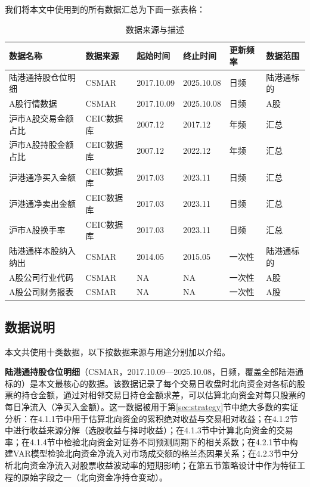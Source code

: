 \documentclass{article}
\begin{document}
我们将本文中使用到的所有数据汇总为下面一张表格：

\begin{table}[!ht]
    \label{tab:data_summary}
    \centering
    \small  %
    \begin{tabularx}{\textwidth}{|X|l|l|l|l|X|}
    \hline
    \textbf{数据名称} & \textbf{数据来源} & \textbf{起始时间} & \textbf{终止时间} & \textbf{更新频率} & \textbf{数据范围} \\ \hline
    陆港通持股仓位明细 & CSMAR & 2017.10.09 & 2025.10.08 & 日频 & 陆港通标的 \\ \hline
    A股行情数据 & CSMAR & 2017.10.09 & 2025.10.08 & 日频 & A股 \\ \hline
    沪市A股交易金额占比 & CEIC数据库 & 2007.12 & 2017.12 & 年频 & 汇总 \\ \hline
    沪市A股持股金额占比 & CEIC数据库 & 2007.12 & 2022.12 & 年频 & 汇总 \\ \hline
    沪港通净买入金额 & CEIC数据库 & 2017.03 & 2023.11 & 日频 & 汇总 \\ \hline
    沪港通净卖出金额 & CEIC数据库 & 2017.03 & 2023.11 & 日频 & 汇总 \\ \hline
    沪市A股换手率 & CEIC数据库 & 2017.03 & 2023.11 & 日频 & 汇总 \\ \hline
    陆港通样本股纳入纳出 & CSMAR & 2014.05 & 2015.05 & 一次性 & 陆港通标的 \\ \hline
    A股公司行业代码 & CSMAR & NA & NA & 一次性 & A股 \\ \hline
    A股公司财务报表 & CSMAR & NA & NA & 一次性 & A股 \\ \hline
    \end{tabularx}
    \caption{数据来源与描述}
\end{table}

\subsection*{数据说明}

本文共使用十类数据，以下按数据来源与用途分别加以介绍。

\textbf{陆港通持股仓位明细}（CSMAR，2017.10.09—2025.10.08，日频，覆盖全部陆港通标的）是本文最核心的数据。该数据记录了每个交易日收盘时北向资金对各标的股票的持仓金额，通过对相邻交易日持仓金额求差，可以估算北向资金对每只股票的每日净流入（净买入金额）。这一数据被用于第\ref{sec:strategy}节中绝大多数的实证分析：在4.1.1节中用于估算北向资金的累积绝对收益与交易相对收益；在4.1.2节中进行收益来源分解（选股收益与择时收益）；在4.1.3节中计算北向资金的交易率；在4.1.4节中检验北向资金对证券不同预测周期下的相关系数；在4.2.1节中构建VAR模型检验北向资金净流入对市场成交额的格兰杰因果关系；在4.2.3节中分析北向资金净流入对股票收益波动率的短期影响；在第五节策略设计中作为特征工程的原始字段之一（北向资金净持仓变动）。
\end{document}
